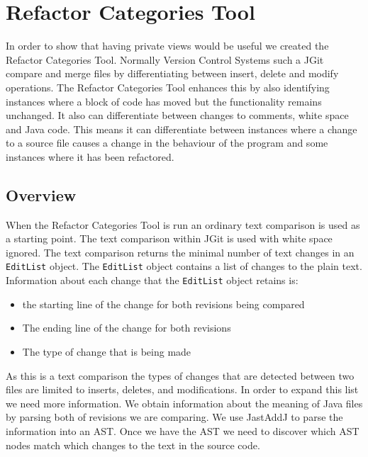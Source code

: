 
\chapter{Refactor Categories Tool}
In order to show that having private views would be useful we created the Refactor Categories Tool. Normally Version Control Systems such a JGit compare and merge files by differentiating between insert, delete and modify operations. The Refactor Categories Tool enhances this by also identifying instances where a block of code has moved but the functionality remains unchanged. It also can differentiate between changes to comments, white space and Java code. This means it can differentiate between instances where a change to a source file causes a change in the behaviour of the program and some instances where it has been refactored.  



\section{Overview}
When the Refactor Categories Tool is run an ordinary text comparison is used as a starting point.
The text comparison within JGit is used with white space ignored.
\label{matchingTextWithAST} The text comparison returns the minimal number of text changes in an \lstinline{EditList} object. 
The \lstinline{EditList} object contains a list of changes to the plain text. Information about each change that the \lstinline{EditList} object retains is:

\begin{itemize}
  \item the starting line of the change for both revisions being compared
  \item The ending line of the change for both revisions 
  \item The type of change that is being made
\end{itemize}

As this is a text comparison the types of changes that are detected between two files are limited to inserts, deletes, and modifications. 
In order to expand this list we need more information.  
We obtain information about the meaning of Java files by parsing both of revisions we are comparing.  
We use JastAddJ \cite{Oqvist2013} to parse the information into an AST. 
Once we have the AST we need to discover which AST nodes match which changes to the text in the source code.

